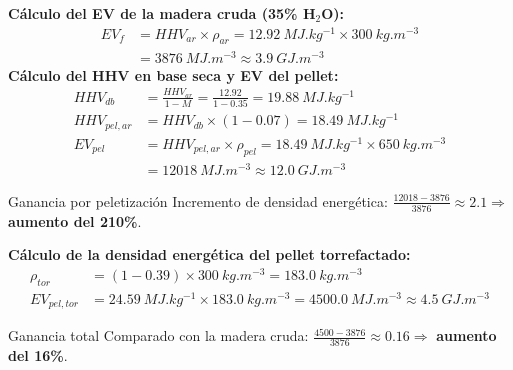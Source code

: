 \documentclass[main.tex]{subfiles}
\begin{document}
\begin{frame}
\textbf{Cálculo del EV de la madera cruda (35\% H$_2$O):}
\begin{align*}
EV_{f} &= HHV_{ar} \times \rho_{ar} = \SI{12.92}{MJ.kg^{-1}} \times \SI{300}{kg.m^{-3}} \\
       &= \SI{3876}{MJ.m^{-3}} \approx \SI{3.9}{GJ.m^{-3}}
\end{align*}
\footnotesize
\textbf{Cálculo del HHV en base seca y EV del pellet:}
\begin{align*}
HHV_{db} &= \frac{HHV_{ar}}{1-M} = \frac{12.92}{1-0.35} = \SI{19.88}{MJ.kg^{-1}} \\
HHV_{pel,ar} &= HHV_{db} \times (1-0.07) = \SI{18.49}{MJ.kg^{-1}} \\
EV_{pel} &= HHV_{pel,ar} \times \rho_{pel} = \SI{18.49}{MJ.kg^{-1}} \times \SI{650}{kg.m^{-3}} \\
         &= \SI{12018}{MJ.m^{-3}} \approx \SI{12.0}{GJ.m^{-3}}
\end{align*}
\begin{alertblock}{Ganancia por peletización}
Incremento de densidad energética: $\frac{12018 - 3876}{3876} \approx 2.1 \Rightarrow$ \textbf{aumento del 210\%}.
\end{alertblock}
\end{frame}

\begin{frame}
\footnotesize
\textbf{Cálculo de la densidad energética del pellet torrefactado:}
\begin{align*}
\rho_{tor} &= (1 - 0.39) \times \SI{300}{kg.m^{-3}} = \SI{183.0}{kg.m^{-3}} \\
EV_{pel,tor} &= \SI{24.59}{MJ.kg^{-1}} \times \SI{183.0}{kg.m^{-3}} = \SI{4500.0}{MJ.m^{-3}} \approx \SI{4.5}{GJ.m^{-3}}
\end{align*}
\begin{block}{Ganancia total}
Comparado con la madera cruda: $\frac{4500 - 3876}{3876} \approx 0.16 \Rightarrow$ \textbf{aumento del 16\%}.
\end{block}
\end{frame}
\end{document}
